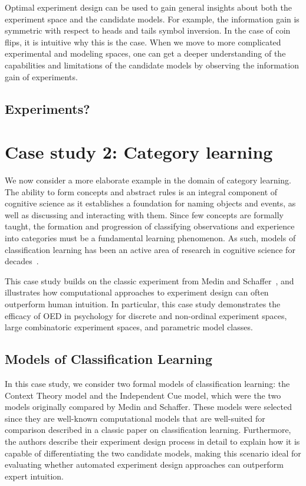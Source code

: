 \documentclass{article}
\begin{document}
Optimal experiment design can be used to gain general insights about both the experiment space and the candidate models. For example, the information gain is symmetric with respect to heads and tails symbol inversion.  In the case of coin flips, it is intuitive why this is the case. When we move to more complicated experimental and modeling spaces, one can get a deeper understanding of the capabilities and limitations of the candidate models by observing the information gain of experiments.

\subsection{Experiments?}


\section{Case study 2: Category learning}

We now consider a more elaborate example in the domain of category learning. The ability to form concepts and abstract rules is an integral component of cognitive science as it establishes a foundation for naming objects and events, as well as discussing and interacting with them. Since few concepts are formally taught, the formation and progression of classifying observations and experience into categories must be a fundamental learning phenomenon. As such, models of classification learning has been an active area of research in cognitive science for decades~\cite{machery10:bbs}. 

 This case study builds on the classic experiment from Medin and Schaffer~\cite{medin78:pr}, and illustrates how computational approaches to experiment design can often outperform human intuition. In particular, this case study demonstrates the efficacy of OED in psychology for discrete and non-ordinal experiment spaces, large combinatoric experiment spaces, and parametric model classes. 

\subsection{Models of Classification Learning}

In this case study, we consider two formal models of classification learning: the Context Theory model and the Independent Cue model, which were the two models originally compared by Medin and Schaffer. These models were selected since they are well-known computational models that are well-suited for comparison described in a classic paper on classification learning. Furthermore, the authors describe their experiment design process in detail to explain how it is capable of differentiating the two candidate models, making this scenario ideal for evaluating whether automated experiment design approaches can outperform expert intuition. 
\end{document}
